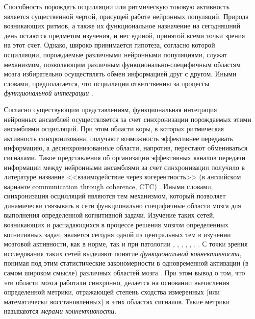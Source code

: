 Способность порождать осцилляции или ритмическую токовую активность является существенной чертой,
присущей работе нейронных популяций. Природа возникающих ритмов, а также их функциональное назначение
на сегодняшний день остаются предметом изучения, и нет единой, принятой всеми точки зрения на этот счет.
Однако, широко принимается гипотеза, согласно которой осцилляции, порождаемые различными нейронными популяциями,
служат механизмом, позволяющим различным функционально-специфичным областям мозга
избирательно осуществлять обмен информацией друг с другом. Иными словами, предполагается, что осцилляции ответственны за
процессы \emph{функциональной интеграции} \cite{}.

Согласно существующим представлениям, функциональная интеграция нейронных ансамблей осуществляется за
счет синхронизации порождаемых этими ансамблями осцилляций. При этом области коры, в которых ритмическая
активность синхронизована, получают возможность эффективнее передавать информацию, а десинхронизованные
области, напротив, перестают обмениваться сигналами. Такое представления об организации эффективных каналов
передачи информации между нейронными ансамблями за счет синхронизации получило в литературе название
<<взаимодействие через когерентность>> (в английском варианте communication through coherence, CTC)
. Иными словами, синхронизация осцилляций
являются тем механизмом, который позволяет динамически связывать в сети функционально специфичные области мозга
для выполнения определенной когнитивной задачи. Изучение таких сетей, возникающих и распадающихся в процессе решения мозгом
определенных когнитивных задач, является сегодня одной из центральных тем в изучении мозговой активности, как в норме,
так и при патологии ,
, ,
, , \cite{myself}, \cite{myself}.
С точки зрения исследования таких сетей выделяют понятие \emph{функциональной коннективности}, понимая
под этим статистические закономерности в одновременной активации (в самом широком смысле) различных областей мозга \cite{}.
При этом вывод о том, что эти области мозга работали синхронно, делается на основании вычисления
определенной метрики, отражающей степень сходства измеренных (или математически восстановленных) в этих областях сигналов.
Такие метрики называются \emph{мерами коннективности}.

